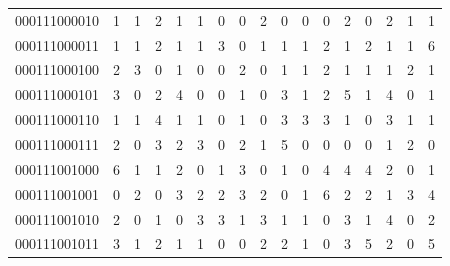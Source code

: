 \documentclass[10pt,a4paper]{article}
\begin{document}
\begin{longtable}{ |c|c|c|c|c|c|c|c|c|c|c|c|c|c|c|c|c| }
    000111000010              & 1                            & 1                                & 2                            & 1                              & 1   & 0   & 0   & 2   & 0   & 0   & 0   & 2   & 0   & 2   & 1   & 1   \\
    000111000011              & 1                            & 1                                & 2                            & 1                              & 1   & 3   & 0   & 1   & 1   & 1   & 2   & 1   & 2   & 1   & 1   & 6   \\
    000111000100              & 2                            & 3                                & 0                            & 1                              & 0   & 0   & 2   & 0   & 1   & 1   & 2   & 1   & 1   & 1   & 2   & 1   \\
    000111000101              & 3                            & 0                                & 2                            & 4                              & 0   & 0   & 1   & 0   & 3   & 1   & 2   & 5   & 1   & 4   & 0   & 1   \\
    000111000110              & 1                            & 1                                & 4                            & 1                              & 1   & 0   & 1   & 0   & 3   & 3   & 3   & 1   & 0   & 3   & 1   & 1   \\
    000111000111              & 2                            & 0                                & 3                            & 2                              & 3   & 0   & 2   & 1   & 5   & 0   & 0   & 0   & 0   & 1   & 2   & 0   \\
    000111001000              & 6                            & 1                                & 1                            & 2                              & 0   & 1   & 3   & 0   & 1   & 0   & 4   & 4   & 4   & 2   & 0   & 1   \\
    000111001001              & 0                            & 2                                & 0                            & 3                              & 2   & 2   & 3   & 2   & 0   & 1   & 6   & 2   & 2   & 1   & 3   & 4   \\
    000111001010              & 2                            & 0                                & 1                            & 0                              & 3   & 3   & 1   & 3   & 1   & 1   & 0   & 3   & 1   & 4   & 0   & 2   \\
    000111001011              & 3                            & 1                                & 2                            & 1                              & 1   & 0   & 0   & 2   & 2   & 1   & 0   & 3   & 5   & 2   & 0   & 5   \\

\end{longtable}
\end{document}
